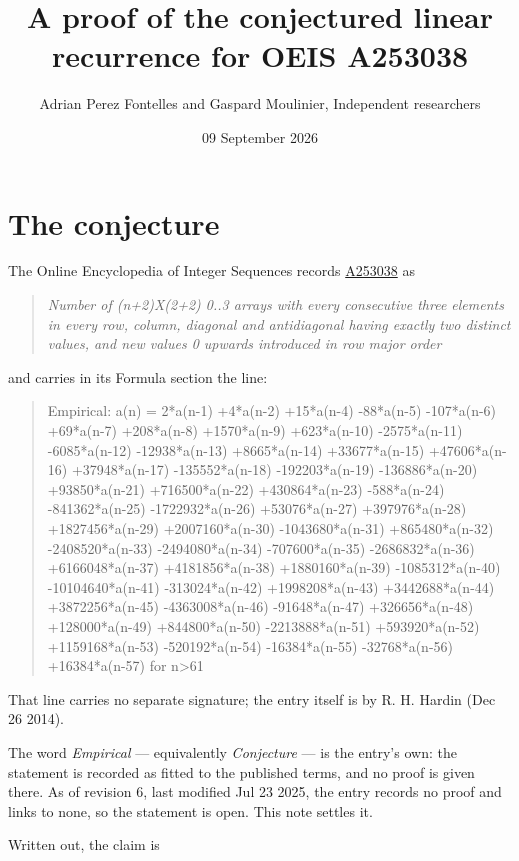 \documentclass[11pt]{article}
\title{A proof of the conjectured linear recurrence for OEIS A253038}
\author{Adrian Perez Fontelles and Gaspard Moulinier, Independent researchers}
\date{09 September 2026}
\theoremstyle{definition}
\begin{document}
\maketitle
\section{The conjecture}

The Online Encyclopedia of Integer Sequences records \href{https://oeis.org/A253038}{A253038} as

\begin{quote}\itshape Number of (n+2)X(2+2) 0..3 arrays with every consecutive three elements in every row, column, diagonal and antidiagonal having exactly two distinct values, and new values 0 upwards introduced in row major order\end{quote}

and carries in its Formula section the line:

\begin{quote}\ttfamily Empirical: a(n) = 2*a(n-1) +4*a(n-2) +15*a(n-4) -88*a(n-5) -107*a(n-6) +69*a(n-7) +208*a(n-8) +1570*a(n-9) +623*a(n-10) -2575*a(n-11) -6085*a(n-12) -12938*a(n-13) +8665*a(n-14) +33677*a(n-15) +47606*a(n-16) +37948*a(n-17) -135552*a(n-18) -192203*a(n-19) -136886*a(n-20) +93850*a(n-21) +716500*a(n-22) +430864*a(n-23) -588*a(n-24) -841362*a(n-25) -1722932*a(n-26) +53076*a(n-27) +397976*a(n-28) +1827456*a(n-29) +2007160*a(n-30) -1043680*a(n-31) +865480*a(n-32) -2408520*a(n-33) -2494080*a(n-34) -707600*a(n-35) -2686832*a(n-36) +6166048*a(n-37) +4181856*a(n-38) +1880160*a(n-39) -1085312*a(n-40) -10104640*a(n-41) -313024*a(n-42) +1998208*a(n-43) +3442688*a(n-44) +3872256*a(n-45) -4363008*a(n-46) -91648*a(n-47) +326656*a(n-48) +128000*a(n-49) +844800*a(n-50) -2213888*a(n-51) +593920*a(n-52) +1159168*a(n-53) -520192*a(n-54) -16384*a(n-55) -32768*a(n-56) +16384*a(n-57) for n>61\end{quote}

That line carries no separate signature; the entry itself is by R. H. Hardin (Dec 26 2014).

The word {\itshape Empirical} --- equivalently {\itshape Conjecture} --- is the entry's own: the statement is recorded as fitted to the published terms, and no proof is given there. As of revision 6, last modified Jul 23 2025, the entry records no proof and links to none, so the statement is open. This note settles it.

Written out, the claim is
\end{document}
